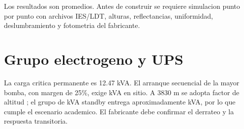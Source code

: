 

Los resultados son promedios. Antes de construir se requiere simulacion punto por punto con archivos IES/LDT, alturas, reflectancias, uniformidad, deslumbramiento y fotometria del fabricante.

\section{Grupo electrogeno y UPS}
La carga critica permanente es 12.47 kVA. El arranque secuencial de la mayor bomba, con margen de 25\%, exige \GrupoArranqueKVA{} kVA en sitio. A 3830 m se adopta factor de altitud \FactorAltitud; el grupo de \GrupoSeleccionadoKVA{} kVA standby entrega aproximadamente \GrupoDisponibleKVA{} kVA, por lo que cumple el escenario academico. El fabricante debe confirmar el derrateo y la respuesta transitoria.
